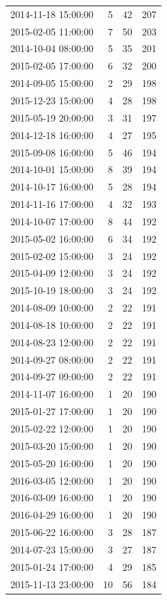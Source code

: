 \begin{tabular}{lrrr}
2014-11-18 15:00:00 & 5 & 42 & 207 \\
2015-02-05 11:00:00 & 7 & 50 & 203 \\
2014-10-04 08:00:00 & 5 & 35 & 201 \\
2015-02-05 17:00:00 & 6 & 32 & 200 \\
2014-09-05 15:00:00 & 2 & 29 & 198 \\
2015-12-23 15:00:00 & 4 & 28 & 198 \\
2015-05-19 20:00:00 & 3 & 31 & 197 \\
2014-12-18 16:00:00 & 4 & 27 & 195 \\
2015-09-08 16:00:00 & 5 & 46 & 194 \\
2014-10-01 15:00:00 & 8 & 39 & 194 \\
2014-10-17 16:00:00 & 5 & 28 & 194 \\
2014-11-16 17:00:00 & 4 & 32 & 193 \\
2014-10-07 17:00:00 & 8 & 44 & 192 \\
2015-05-02 16:00:00 & 6 & 34 & 192 \\
2015-02-02 15:00:00 & 3 & 24 & 192 \\
2015-04-09 12:00:00 & 3 & 24 & 192 \\
2015-10-19 18:00:00 & 3 & 24 & 192 \\
2014-08-09 10:00:00 & 2 & 22 & 191 \\
2014-08-18 10:00:00 & 2 & 22 & 191 \\
2014-08-23 12:00:00 & 2 & 22 & 191 \\
2014-09-27 08:00:00 & 2 & 22 & 191 \\
2014-09-27 09:00:00 & 2 & 22 & 191 \\
2014-11-07 16:00:00 & 1 & 20 & 190 \\
2015-01-27 17:00:00 & 1 & 20 & 190 \\
2015-02-22 12:00:00 & 1 & 20 & 190 \\
2015-03-20 15:00:00 & 1 & 20 & 190 \\
2015-05-20 16:00:00 & 1 & 20 & 190 \\
2016-03-05 12:00:00 & 1 & 20 & 190 \\
2016-03-09 16:00:00 & 1 & 20 & 190 \\
2016-04-29 16:00:00 & 1 & 20 & 190 \\
2015-06-22 16:00:00 & 3 & 28 & 187 \\
2014-07-23 15:00:00 & 3 & 27 & 187 \\
2015-01-24 17:00:00 & 4 & 29 & 185 \\
2015-11-13 23:00:00 & 10 & 56 & 184 \\

\end{tabular}
